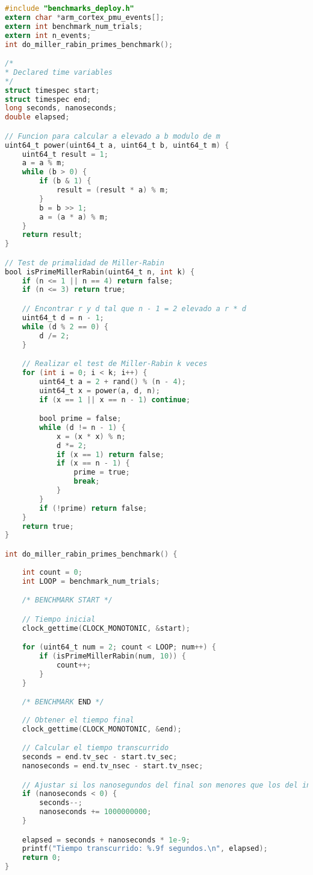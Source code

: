 \begin{lstlisting}[language=C,frame=single,showstringspaces=false,caption={Código fuente del benchmark Cálculo de números primos},label=lst:calcprimes-benchmark]
#include "benchmarks_deploy.h"
extern char *arm_cortex_pmu_events[];
extern int benchmark_num_trials;
extern int n_events;
int do_miller_rabin_primes_benchmark();

/*
* Declared time variables
*/
struct timespec start;
struct timespec end;
long seconds, nanoseconds;
double elapsed;

// Funcion para calcular a elevado a b modulo de m
uint64_t power(uint64_t a, uint64_t b, uint64_t m) {
    uint64_t result = 1;
    a = a % m;
    while (b > 0) {
        if (b & 1) {
            result = (result * a) % m;
        }
        b = b >> 1;
        a = (a * a) % m;
    }
    return result;
}

// Test de primalidad de Miller-Rabin
bool isPrimeMillerRabin(uint64_t n, int k) {
    if (n <= 1 || n == 4) return false;
    if (n <= 3) return true;

    // Encontrar r y d tal que n - 1 = 2 elevado a r * d
    uint64_t d = n - 1;
    while (d % 2 == 0) {
        d /= 2;
    }

    // Realizar el test de Miller-Rabin k veces
    for (int i = 0; i < k; i++) {
        uint64_t a = 2 + rand() % (n - 4);
        uint64_t x = power(a, d, n);
        if (x == 1 || x == n - 1) continue;

        bool prime = false;
        while (d != n - 1) {
            x = (x * x) % n;
            d *= 2;
            if (x == 1) return false;
            if (x == n - 1) {
                prime = true;
                break;
            }
        }
        if (!prime) return false;
    }
    return true;
}

int do_miller_rabin_primes_benchmark() {
    
    int count = 0;
    int LOOP = benchmark_num_trials;

    /* BENCHMARK START */

    // Tiempo inicial
    clock_gettime(CLOCK_MONOTONIC, &start);

    for (uint64_t num = 2; count < LOOP; num++) {
        if (isPrimeMillerRabin(num, 10)) {
            count++;
        }
    }

    /* BENCHMARK END */
    
    // Obtener el tiempo final
    clock_gettime(CLOCK_MONOTONIC, &end);

    // Calcular el tiempo transcurrido
    seconds = end.tv_sec - start.tv_sec;
    nanoseconds = end.tv_nsec - start.tv_nsec;

    // Ajustar si los nanosegundos del final son menores que los del inicio
    if (nanoseconds < 0) {
        seconds--;
        nanoseconds += 1000000000;
    }

    elapsed = seconds + nanoseconds * 1e-9;
    printf("Tiempo transcurrido: %.9f segundos.\n", elapsed);
    return 0;
}
\end{lstlisting}

